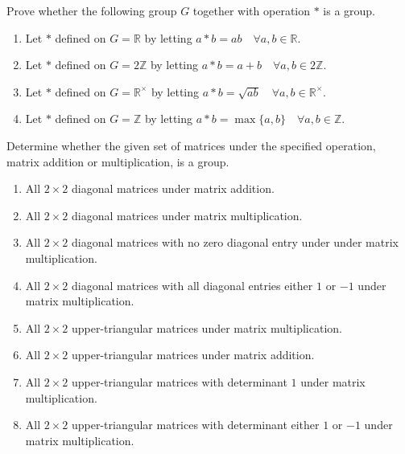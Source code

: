 \begin{mdframed}
    \vspace{-0.25cm}
    \hspace{-0.25cm}
    \begin{Exercise}
        Prove whether the following group $G$ together with operation $*$ is a group.
        \begin{enumerate}
            \item Let $*$ defined on $G = \mathbb{R}$ by letting $a * b = ab \quad \forall a, b \in \mathbb{R}$.
            \item Let $*$ defined on $G = 2\mathbb{Z}$ by letting $a * b = a + b \quad \forall a, b \in 2\mathbb{Z}$.
            \item Let $*$ defined on $G = \mathbb{R}^\times$ by letting $a * b = \sqrt{ab} \quad \forall a, b \in \mathbb{R}^\times$.
            \item Let $*$ defined on $G = \mathbb{Z}$ by letting $a * b = \max \{a,b\} \quad \forall a, b \in \mathbb{Z}$.
        \end{enumerate}
    \end{Exercise}

    \vspace{0.752cm}
    \begin{Exercise}
        Determine whether the given set of matrices under the specified operation, matrix addition or multiplication, is a group.
        \begin{enumerate}
            \item All $2 \times 2$ diagonal matrices under matrix addition.
            \item All $2 \times 2$ diagonal matrices under matrix multiplication.
            \item All $2 \times 2$ diagonal matrices with no zero diagonal entry under under matrix multiplication.
            \item All $2 \times 2$ diagonal matrices with all diagonal entries either $1$ or $-1$ under matrix multiplication.
            \item All $2 \times 2$ upper-triangular matrices under matrix multiplication.
            \item All $2 \times 2$ upper-triangular matrices under matrix addition.
            \item All $2 \times 2$ upper-triangular matrices with determinant $1$ under matrix multiplication.
            \item All $2 \times 2$ upper-triangular matrices with determinant either $1$ or $-1$ under matrix multiplication.
        \end{enumerate}
    \end{Exercise}


\end{mdframed}
